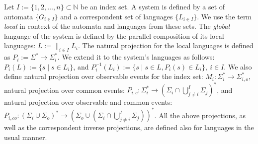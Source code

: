 \documentclass[a4paper, 10pt, conference]{ieeeconf}
\begin{document}
Let $I := \{1,2,\ldots,n\} \subset  \mathbb{N}$ be an index set. A system is
defined by a set of automata $\{G_{i \in I}\}$ and a correspondent set of
languages $\{L_{i \in I}\}$. We use the term \emph{local} in context of the
automata and languages from these sets. The \emph{global} language of the system
is defined by the parallel composition \cite{cassandras_introduction_2010} of
its local languages:
$L := \parallel_{i \in I} L_i$.
The natural projection for the local languages is defined as 
$P_i := \Sigma^* \rightarrow \Sigma_i^*$. We extend it to the system's languages
as follows: $P_i(L) := \{s\mid s\in L_{i}\}$, and 
$P_i^{-1}(L_{i}) := \{s \mid s \in L, P_i(s) \in L_i\}, ~i \in I$.
We also define natural projection over observable events for the index set: 
$M_i :\Sigma_i^* \rightarrow \Sigma_{i,o}^*$, natural projection over common
events:
$P_{i,c} : \Sigma_i^* \rightarrow (\Sigma_i \cap \bigcup_{j\neq
i}^I\Sigma_j)^*$, and natural projection over observable and common events:
$P_{i,co} : (\Sigma_i \cup \Sigma_o)^* \rightarrow (\Sigma_{o} \cup (\Sigma_i
\cap \bigcup_{j\neq i}^I\Sigma_j))^*$. All the above projections, as well as
the correspondent inverse projections, are defined also for languages in the
usual manner.


% 
% 
\end{document}
